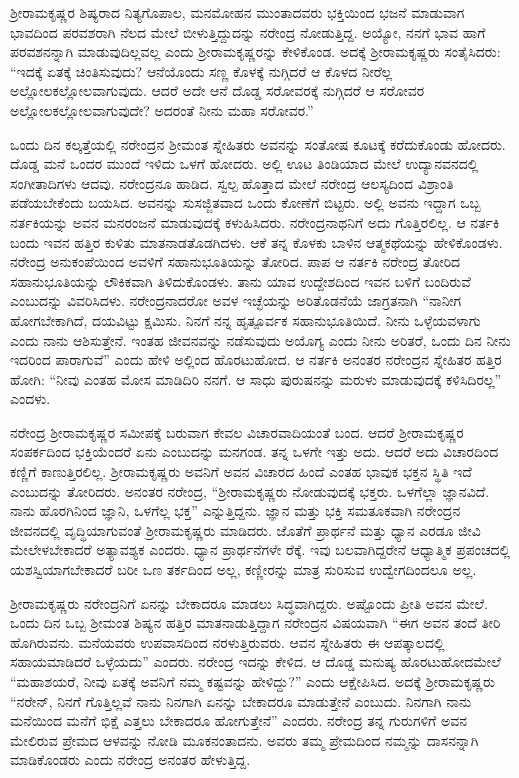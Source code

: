 ಶ‍್ರೀರಾಮಕೃಷ್ಣರ ಶಿಷ್ಯರಾದ ನಿತ್ಯಗೊಪಾಲ, ಮನಮೋಹನ ಮುಂತಾದವರು ಭಕ್ತಿಯಿಂದ ಭಜನೆ ಮಾಡುವಾಗ ಭಾವದಿಂದ ಪರವಶರಾಗಿ ನೆಲದ ಮೇಲೆ ಬೀಳುತ್ತಿದ್ದುದನ್ನು ನರೇಂದ್ರ ನೋಡುತ್ತಿದ್ದ. ಅಯ್ಯೋ, ನನಗೆ ಭಾವ ಹಾಗೆ ಪರವಶನನ್ನಾಗಿ ಮಾಡುವುದಿಲ್ಲವಲ್ಲ ಎಂದು ಶ‍್ರೀರಾಮಕೃಷ್ಣರನ್ನು ಕೇಳಿಕೊಂಡ. ಅದಕ್ಕೆ ಶ‍್ರೀರಾಮಕೃಷ್ಣರು ಸಂತೈಸಿದರು: “ಇದಕ್ಕೆ ಏತಕ್ಕೆ ಚಿಂತಿಸುವುದು? ಆನೆಯೊಂದು ಸಣ್ಣ ಕೊಳಕ್ಕೆ ನುಗ್ಗಿದರೆ ಆ ಕೊಳದ ನೀರೆಲ್ಲ ಅಲ್ಲೋಲಕಲ್ಲೋಲವಾಗುವುದು. ಆದರೆ ಅದೇ ಆನೆ ದೊಡ್ಡ ಸರೋವರಕ್ಕೆ ನುಗ್ಗಿದರೆ ಆ ಸರೋವರ ಅಲ್ಲೋಲಕಲ್ಲೋಲವಾಗುವುದೇ? ಅದರಂತೆ ನೀನು ಮಹಾ ಸರೋವರ.”

ಒಂದು ದಿನ ಕಲ್ಕತ್ತೆಯಲ್ಲಿ ನರೇಂದ್ರನ ಶ‍್ರೀಮಂತ ಸ್ನೇಹಿತರು ಅವನನ್ನು ಸಂತೋಷ ಕೂಟಕ್ಕೆ ಕರೆದುಕೊಂಡು ಹೋದರು. ದೊಡ್ಡ ಮನೆ ಒಂದರ ಮುಂದೆ ಇಳಿದು ಒಳಗೆ ಹೋದರು. ಅಲ್ಲಿ ಊಟ ತಿಂಡಿಯಾದ ಮೇಲೆ ಉದ್ಯಾನವನದಲ್ಲಿ ಸಂಗೀತಾದಿಗಳು ಆದವು. ನರೇಂದ್ರನೂ ಹಾಡಿದ. ಸ್ವಲ್ಪ ಹೊತ್ತಾದ ಮೇಲೆ ನರೇಂದ್ರ ಆಲಸ್ಯದಿಂದ ವಿಶ್ರಾಂತಿ ಪಡೆಯಬೇಕೆಂದು ಬಯಸಿದ. ಅವನನ್ನು ಸುಸಜ್ಜಿತವಾದ ಒಂದು ಕೋಣೆಗೆ ಬಿಟ್ಟರು. ಅಲ್ಲಿ ಅವನು ಇದ್ದಾಗ ಒಬ್ಬ ನರ್ತಕಿಯನ್ನು ಅವನ ಮನರಂಜನೆ ಮಾಡುವುದಕ್ಕೆ ಕಳುಹಿಸಿದರು. ನರೇಂದ್ರನಾಥನಿಗೆ ಅದು ಗೊತ್ತಿರಲಿಲ್ಲ. ಆ ನರ್ತಕಿ ಬಂದು ಇವನ ಹತ್ತಿರ ಕುಳಿತು ಮಾತನಾಡತೊಡಗಿದಳು. ಆಕೆ ತನ್ನ ಕೊಳಕು ಬಾಳಿನ ಆತ್ಮಕಥೆಯನ್ನು ಹೇಳಿಕೊಂಡಳು. ನರೇಂದ್ರ ಅನುಕಂಪೆಯಿಂದ ಅವಳಿಗೆ ಸಹಾನುಭೂತಿಯನ್ನು ತೋರಿದ. ಪಾಪ ಆ ನರ್ತಕಿ ನರೇಂದ್ರ ತೋರಿದ ಸಹಾನುಭೂತಿಯನ್ನು ಲೌಕಿಕವಾಗಿ ತಿಳಿದುಕೊಂಡಳು. ತಾನು ಯಾವ ಉದ್ದೇಶದಿಂದ ಇವನ ಬಳಿಗೆ ಬಂದಿರುವೆ ಎಂಬುದನ್ನು ವಿವರಿಸಿದಳು. ನರೇಂದ್ರನಾದರೋ ಅವಳ ಇಚ್ಛೆಯನ್ನು ಅರಿತೊಡನೆಯೆ ಜಾಗ್ರತನಾಗಿ “ನಾನೀಗ ಹೋಗಬೇಕಾಗಿದೆ, ದಯವಿಟ್ಟು ಕ್ಷಮಿಸು. ನಿನಗೆ ನನ್ನ ಹೃತ್ಪೂರ್ವಕ ಸಹಾನುಭೂತಿಯಿದೆ. ನೀನು ಒಳ್ಳೆಯವಳಾಗು ಎಂದು ನಾನು ಆಶಿಸುತ್ತೇನೆ. ಇಂತಹ ಜೀವನವನ್ನು ನಡೆಸುವುದು ಅಯೊಗ್ಯ ಎಂದು ನೀನು ಅರಿತರೆ, ಒಂದು ದಿನ ನೀನು ಇದರಿಂದ ಪಾರಾಗುವೆ” ಎಂದು ಹೇಳಿ ಅಲ್ಲಿಂದ ಹೊರಟುಹೋದ. ಆ ನರ್ತಕಿ ಅನಂತರ ನರೇಂದ್ರನ ಸ್ನೇಹಿತರ ಹತ್ತಿರ ಹೋಗಿ: “ನೀವು ಎಂತಹ ಮೋಸ ಮಾಡಿದಿರಿ ನನಗೆ. ಆ ಸಾಧು ಪುರುಷನನ್ನು ಮರುಳು ಮಾಡುವುದಕ್ಕೆ ಕಳಿಸಿದಿರಲ್ಲ” ಎಂದಳು.

ನರೇಂದ್ರ ಶ‍್ರೀರಾಮಕೃಷ್ಣರ ಸಮೀಪಕ್ಕೆ ಬರುವಾಗ ಕೇವಲ ವಿಚಾರವಾದಿಯಂತೆ ಬಂದ. ಆದರೆ ಶ‍್ರೀರಾಮಕೃಷ್ಣರ ಸಂಪರ್ಕದಿಂದ ಭಕ್ತಿಯೆಂದರೆ ಏನು ಎಂಬುದನ್ನು ಮನಗಂಡ. ತನ್ನ ಒಳಗೇ ಇತ್ತು ಅದು. ಆದರೆ ಅದು ವಿಚಾರದಿಂದ ಕಣ್ಣಿಗೆ ಕಾಣುತ್ತಿರಲಿಲ್ಲ. ಶ‍್ರೀರಾಮಕೃಷ್ಣರು ಅವನಿಗೆ ಅವನ ವಿಚಾರದ ಹಿಂದೆ ಎಂತಹ ಭಾವುಕ ಭಕ್ತನ ಸ್ಥಿತಿ ಇದೆ ಎಂಬುದನ್ನು ತೋರಿದರು. ಅನಂತರ ನರೇಂದ್ರ, “ಶ‍್ರೀರಾಮಕೃಷ್ಣರು ನೋಡುವುದಕ್ಕೆ ಭಕ್ತರು. ಒಳಗೆಲ್ಲಾ ಜ್ಞಾನವಿದೆ. ನಾನು ಹೊರಗಿನಿಂದ ಜ್ಞಾನಿ, ಒಳಗೆಲ್ಲ ಭಕ್ತ” ಎನ್ನುತ್ತಿದ್ದನು. ಜ್ಞಾನ ಮತ್ತು ಭಕ್ತಿ ಸಮತೂಕವಾಗಿ ನರೇಂದ್ರನ ಜೀವನದಲ್ಲಿ ವೃದ್ಧಿಯಾಗುವಂತೆ ಶ‍್ರೀರಾಮಕೃಷ್ಣರು ಮಾಡಿದರು. ಜೊತೆಗೆ ಪ್ರಾರ್ಥನೆ ಮತ್ತು ಧ್ಯಾನ ಎರಡೂ ಜೀವಿ ಮೇಲೇಳಬೇಕಾದರೆ ಅತ್ಯಾವಶ್ಯಕ ಎಂದರು. ಧ್ಯಾನ ಪ್ರಾರ್ಥನೆಗಳೇ ರೆಕ್ಕೆ. ಇವು ಬಲವಾಗಿದ್ದರೇನೆ ಆಧ್ಯಾತ್ಮಿಕ ಪ್ರಪಂಚದಲ್ಲಿ ಯಶಸ್ವಿಯಾಗಬೇಕಾದರೆ ಬರೀ ಒಣ ತರ್ಕದಿಂದ ಅಲ್ಲ, ಕಣ್ಣೀರನ್ನು ಮಾತ್ರ ಸುರಿಸುವ ಉದ್ವೇಗದಿಂದಲೂ ಅಲ್ಲ.

ಶ‍್ರೀರಾಮಕೃಷ್ಣರು ನರೇಂದ್ರನಿಗೆ ಏನನ್ನು ಬೇಕಾದರೂ ಮಾಡಲು ಸಿದ್ಧವಾಗಿದ್ದರು. ಅಷ್ಟೊಂದು ಪ್ರೀತಿ ಅವನ ಮೇಲೆ. ಒಂದು ದಿನ ಒಬ್ಬ ಶ‍್ರೀಮಂತ ಶಿಷ್ಯನ ಹತ್ತಿರ ಮಾತನಾಡುತ್ತಿದ್ದಾಗ ನರೇಂದ್ರನ ವಿಷಯವಾಗಿ “ಈಗ ಅವನ ತಂದೆ ತೀರಿ ಹೊಗಿರುವನು. ಮನೆಯವರು ಉಪವಾಸದಿಂದ ನರಳುತ್ತಿರುವರು. ಆವನ ಸ್ನೇಹಿತರು ಈ ಆಪತ್ಕಾಲದಲ್ಲಿ ಸಹಾಯಮಾಡಿದರೆ ಒಳ್ಳೆಯದು” ಎಂದರು. ನರೇಂದ್ರ ಇದನ್ನು ಕೇಳಿದ. ಆ ದೊಡ್ಡ ಮನುಷ್ಯ ಹೊರಟುಹೋದಮೇಲೆ “ಮಹಾಶಯರೆ, ನೀವು ಏತಕ್ಕೆ ಅವನಿಗೆ ನಮ್ಮ ಕಷ್ಟವನ್ನು ಹೇಳಿದ್ದು?” ಎಂದು ಆಕ್ಷೇಪಿಸಿದ. ಅದಕ್ಕೆ ಶ‍್ರೀರಾಮಕೃಷ್ಣರು “ನರೇನ್, ನಿನಗೆ ಗೊತ್ತಿಲ್ಲವೆ ನಾನು ನಿನಗಾಗಿ ಏನನ್ನು ಬೇಕಾದರೂ ಮಾಡುತ್ತೇನೆ ಎಂಬುದು. ನಿನಗಾಗಿ ನಾನು ಮನೆಯಿಂದ ಮನೆಗೆ ಭಿಕ್ಷೆ ಎತ್ತಲು ಬೇಕಾದರೂ ಹೋಗುತ್ತೇನೆ” ಎಂದರು. ನರೇಂದ್ರ ತನ್ನ ಗುರುಗಳಿಗೆ ಅವನ ಮೇಲಿರುವ ಪ್ರೇಮದ ಆಳವನ್ನು ನೋಡಿ ಮೂಕನಂತಾದನು. ಅವರು ತಮ್ಮ ಪ್ರೇಮದಿಂದ ನಮ್ಮನ್ನು ದಾಸನನ್ನಾಗಿ ಮಾಡಿಕೊಂಡರು ಎಂದು ನರೇಂದ್ರ ಅನಂತರ ಹೇಳುತ್ತಿದ್ದ.

